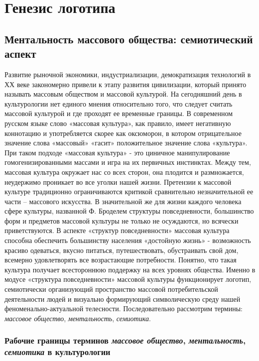\section{Генезис логотипа}\label{chapter1}

\subsection{Ментальность массового общества: семиотический аспект}\label{1}
Развитие рыночной экономики, индустриализации, демократизация технологий в ХХ веке закономерно привели к этапу развития цивилизации, который принято называть массовым обществом и массовой культурой. На сегодняшний день в культурологии нет единого мнения относительно того, что следует считать массовой культурой и где проходят ее временные границы. В современном русском языке слово «массовая культура», как правило, имеет негативную коннотацию и употребляется скорее как оксюморон, в котором отрицательное значение слова «массовый» «гасит» положительное значение слова «культура». \autocite{elistratov2012} При таком подходе «массовая культура» - это циничное манипулирование гомогенизированными массами и игра на их первичных инстинктах. Между тем, массовая культура окружает нас со всех сторон, она плодится и размножается, неудержимо проникает во все уголки нашей жизни. Претензии к массовой культуре традиционно ограничиваются критикой сравнительно незначительной ее части – массового искусства. В значительной же для жизни каждого человека сфере культуры, названной Ф. Броделем структуры повседневности, большинство форм и предметов массовой культуры не только не  осуждаются, но всячески приветствуются. В аспекте «структур повседневности» массовая культура способна обеспечить большинству населения «достойную жизнь» - возможность красиво одеваться, вкусно питаться, путешествовать, обустраивать свой дом, всемерно удовлетворять все возрастающие потребности. Понятно, что такая культура получает всестороннюю поддержку на всех уровнях общества. Именно в модусе «структура повседневности» массовой культуры функционирует логотип, семиотически организующий пространство массовой потребительской деятельности людей и визуально формирующий символическую среду нашей феноменально-актуальной телесности. Последовательно рассмотрим термины: \emph{массовое общество}, \emph{ментальность},
\emph{семиотика}.\autocite{society}

\subsubsection{Рабочие границы терминов \emph{массовое общество}, \emph{ментальность}, \emph{семиотика} в культурологии}\label{1.1} 
